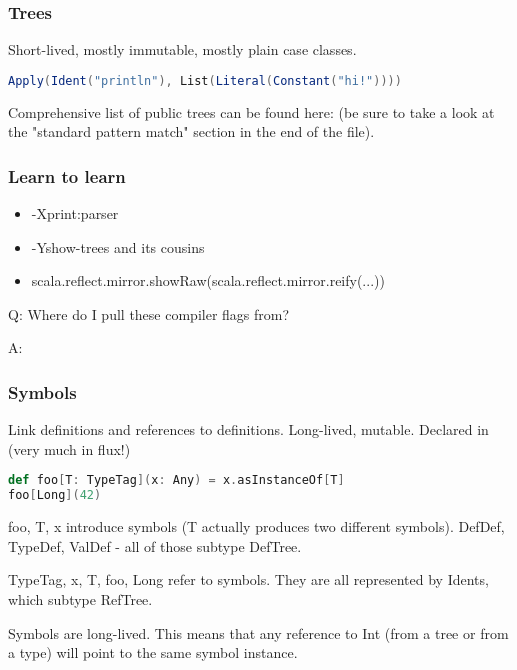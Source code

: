 \documentclass[hyperref={bookmarks=false}]{beamer}
\begin{document}
\begin{frame}[fragile]
\frametitle{Trees}

Short-lived, mostly immutable, mostly plain case classes.

\begin{lstlisting}[language=Scala]
Apply(Ident("println"), List(Literal(Constant("hi!"))))
\end{lstlisting}

Comprehensive list of public trees can be found here:
(be sure to take a look at the "standard pattern match" section in the end of the file).

\end{frame}

\begin{frame}[fragile]
\frametitle{Learn to learn}

\begin{itemize}
\item -Xprint:parser
\item -Yshow-trees and its cousins
\item scala.reflect.mirror.showRaw(scala.reflect.mirror.reify(...))
\end{itemize}

Q: Where do I pull these compiler flags from?

A: 

\end{frame}

\begin{frame}[fragile]
\frametitle{Symbols}

Link definitions and references to definitions.
Long-lived, mutable.
Declared in  (very much in flux!)

\begin{lstlisting}[language=Scala]
def foo[T: TypeTag](x: Any) = x.asInstanceOf[T]
foo[Long](42)
\end{lstlisting}

foo, T, x introduce symbols (T actually produces two different symbols).
DefDef, TypeDef, ValDef - all of those subtype DefTree.

TypeTag, x, T, foo, Long refer to symbols.
They are all represented by Idents, which subtype RefTree.

Symbols are long-lived. This means that any
reference to Int (from a tree or from a type) will point to the
same symbol instance.

\end{frame}
\end{document}
